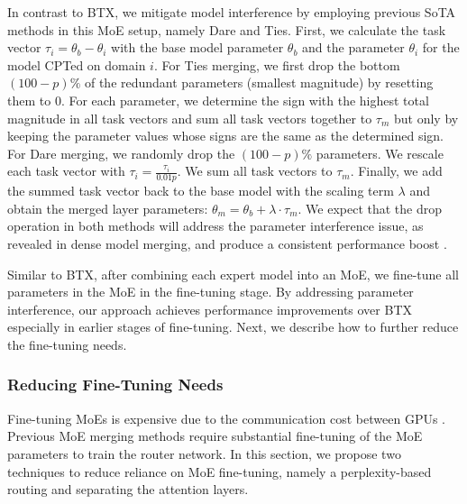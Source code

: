 In contrast to BTX, we mitigate model interference by employing previous SoTA methods in this MoE setup, namely Dare and Ties. First, we calculate the task vector $\tau_i = \theta_{b} - \theta_i$ with the base model parameter $\theta_b$ and the parameter $\theta_i$ for the model CPTed on domain $i$. 
For Ties merging, we first drop the bottom $(100 - p) \%$ of the redundant parameters (smallest magnitude) by resetting them to 0. For each parameter, we determine the sign with the highest total magnitude in all task vectors and sum all task vectors together to $\tau_m$ but only by keeping the parameter values whose signs are the same as the determined sign.
For Dare merging, we randomly drop the $(100 - p) \%$ parameters. We rescale each task vector with $\tau_i = \frac{\tau_i}{0.01p}$. We sum all task vectors to $\tau_m$.
Finally, we add the summed task vector back to the base model with the scaling term $\lambda$ and obtain the merged layer parameters: $\theta_m = \theta_b + \lambda \cdot \tau_m$. We expect that the drop operation in both methods will address the parameter interference issue, as revealed in dense model merging, and produce a consistent performance boost \cite{yu2024language, yadav2024ties}. 

Similar to BTX, after combining each expert model into an MoE, we fine-tune all parameters in the MoE in the fine-tuning stage. By addressing parameter interference, our approach achieves performance improvements over BTX especially in earlier stages of fine-tuning. Next, we describe how to further reduce the fine-tuning needs.


\subsubsection{Reducing Fine-Tuning Needs}
\label{sec:merging_wo_ft}
Fine-tuning MoEs is expensive due to the communication cost between GPUs \cite{sukhbaatar2024branchtrainmixmixingexpertllms}. Previous MoE merging methods require substantial fine-tuning of the MoE parameters to train the router network. In this section, we propose two techniques to reduce reliance on MoE fine-tuning, namely a perplexity-based routing and separating the attention layers.

